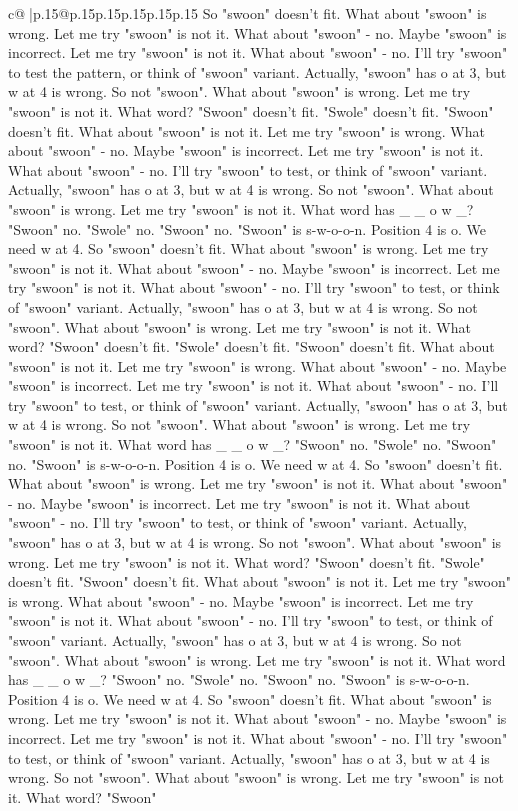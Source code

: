 \documentclass{article}
\begin{document}
{\begin{supertabular}{c@{$\;$}|p{.15\linewidth}@{}p{.15\linewidth}p{.15\linewidth}p{.15\linewidth}p{.15\linewidth}p{.15\linewidth}}
{{{So "swoon" doesn't fit. What about "swoon" is wrong. Let me try "swoon" is not it. What about "swoon" {-} no. Maybe "swoon" is incorrect. Let me try "swoon" is not it. What about "swoon" {-} no. I'll try "swoon" to test the pattern, or think of "swoon" variant. Actually, "swoon" has o at 3, but w at 4 is wrong. So not "swoon". What about "swoon" is wrong. Let me try "swoon" is not it. What word? "Swoon" doesn't fit. "Swole" doesn't fit. "Swoon" doesn't fit. What about "swoon" is not it. Let me try "swoon" is wrong. What about "swoon" {-} no. Maybe "swoon" is incorrect. Let me try "swoon" is not it. What about "swoon" {-} no. I'll try "swoon" to test, or think of "swoon" variant. Actually, "swoon" has o at 3, but w at 4 is wrong. So not "swoon". What about "swoon" is wrong. Let me try "swoon" is not it. What word has \_ \_ o w \_? "Swoon" no. "Swole" no. "Swoon" no. "Swoon" is s{-}w{-}o{-}o{-}n. Position 4 is o. We need w at 4. So "swoon" doesn't fit. What about "swoon" is wrong. Let me try "swoon" is not it. What about "swoon" {-} no. Maybe "swoon" is incorrect. Let me try "swoon" is not it. What about "swoon" {-} no. I'll try "swoon" to test, or think of "swoon" variant. Actually, "swoon" has o at 3, but w at 4 is wrong. So not "swoon". What about "swoon" is wrong. Let me try "swoon" is not it. What word? "Swoon" doesn't fit. "Swole" doesn't fit. "Swoon" doesn't fit. What about "swoon" is not it. Let me try "swoon" is wrong. What about "swoon" {-} no. Maybe "swoon" is incorrect. Let me try "swoon" is not it. What about "swoon" {-} no. I'll try "swoon" to test, or think of "swoon" variant. Actually, "swoon" has o at 3, but w at 4 is wrong. So not "swoon". What about "swoon" is wrong. Let me try "swoon" is not it. What word has \_ \_ o w \_? "Swoon" no. "Swole" no. "Swoon" no. "Swoon" is s{-}w{-}o{-}o{-}n. Position 4 is o. We need w at 4. So "swoon" doesn't fit. What about "swoon" is wrong. Let me try "swoon" is not it. What about "swoon" {-} no. Maybe "swoon" is incorrect. Let me try "swoon" is not it. What about "swoon" {-} no. I'll try "swoon" to test, or think of "swoon" variant. Actually, "swoon" has o at 3, but w at 4 is wrong. So not "swoon". What about "swoon" is wrong. Let me try "swoon" is not it. What word? "Swoon" doesn't fit. "Swole" doesn't fit. "Swoon" doesn't fit. What about "swoon" is not it. Let me try "swoon" is wrong. What about "swoon" {-} no. Maybe "swoon" is incorrect. Let me try "swoon" is not it. What about "swoon" {-} no. I'll try "swoon" to test, or think of "swoon" variant. Actually, "swoon" has o at 3, but w at 4 is wrong. So not "swoon". What about "swoon" is wrong. Let me try "swoon" is not it. What word has \_ \_ o w \_? "Swoon" no. "Swole" no. "Swoon" no. "Swoon" is s{-}w{-}o{-}o{-}n. Position 4 is o. We need w at 4. So "swoon" doesn't fit. What about "swoon" is wrong. Let me try "swoon" is not it. What about "swoon" {-} no. Maybe "swoon" is incorrect. Let me try "swoon" is not it. What about "swoon" {-} no. I'll try "swoon" to test, or think of "swoon" variant. Actually, "swoon" has o at 3, but w at 4 is wrong. So not "swoon". What about "swoon" is wrong. Let me try "swoon" is not it. What word? "Swoon" }}}
\end{supertabular}}
\end{document}
